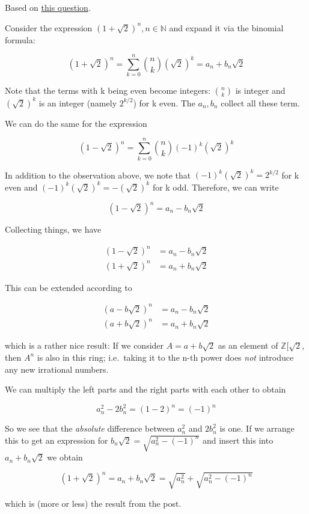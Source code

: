 
Based on
\href{http://math.stackexchange.com/questions/1869954/expansion-of-1-sqrt2n}{this
question}.

Consider the expression \((1+\sqrt{2})^n, n \in \mathbb{N}\) and expand
it via the binomial formula:

\[
(1+\sqrt{2})^n = \sum_{k=0}^n {n \choose k} (\sqrt{2})^k = a_n + b_n \sqrt{2}
\]

Note that the terms with k being even become integers: \({n \choose k}\)
is integer and \((\sqrt{2})^k\) is an integer (namely \(2^{k/2}\)) for k
even. The \(a_n, b_n\) collect all these term.

We can do the same for the expression

\[
(1-\sqrt{2})^n = \sum_{k=0}^n {n \choose k} (-1)^k (\sqrt{2})^k
\]

In addition to the observation above, we note that
\((-1)^k (\sqrt{2})^k = 2^{k/2}\) for k even and
\((-1)^k (\sqrt{2})^k = -(\sqrt{2})^k\) for k odd. Therefore, we can
write

\[
(1-\sqrt{2})^n = a_n - b_n \sqrt{2}
\]

Collecting things, we have


\begin{align*}
(1-\sqrt{2})^n &= a_n - b_n \sqrt{2} \\
(1+\sqrt{2})^n &= a_n + b_n \sqrt{2}
\end{align*}


This can be extended according to


\begin{align*}
(a-b\sqrt{2})^n &= a_n - b_n \sqrt{2} \\
(a+b\sqrt{2})^n &= a_n + b_n \sqrt{2}
\end{align*}


which is a rather nice result: If we consider \(A = a+b\sqrt{2}\) as an
element of \(\mathbb{Z}[\sqrt{2}\), then \(A^n\) is also in this ring;
i.e.~taking it to the n-th power does \emph{not} introduce any new
irrational numbers.

We can multiply the left parts and the right parts with each other to
obtain

\[
a_n^2 - 2b_n^2 = (1-2)^n = (-1)^n
\]

So we see that the \emph{absolute} difference between \(a_n^2\) and
\(2b_n^2\) is one. If we arrange this to get an expression for
\(b_n \sqrt{2} = \sqrt{a_n^2-(-1)^n}\) and insert this into
\(a_n + b_n \sqrt{2}\) we obtain

\[
(1+\sqrt{2})^n = a_n + b_n \sqrt{2} = \sqrt{a_n^2} + \sqrt{a_n^2 - (-1)^n}
\]

which is (more or less) the result from the post.
